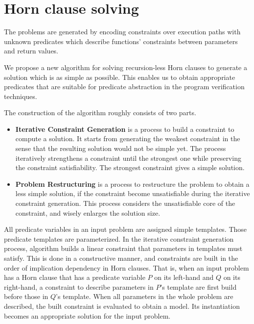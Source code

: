 \chapter{Horn clause solving}
\label{chap:horn}

The problems are generated by encoding constraints over execution
paths with unknown predicates which describe functions' constraints
between parameters and return values.



We propose a new algorithm for solving recursion-less Horn clauses to
generate a solution which is as simple as possible.  This enables us
to obtain appropriate predicates that are suitable for predicate
abstraction in the program verification techniques.

The construction of the algorithm roughly consists of two parts.
\begin{itemize}
\item \textbf{Iterative Constraint Generation} is a process to build a
  constraint to compute a solution.  It starts from generating the
  weakest constraint in the sense that the resulting solution would
  not be simple yet.  The process iteratively strengthens a constraint
  until the strongest one while preserving the constraint
  satisfiability.  The strongest constraint gives a simple solution.
\item \textbf{Problem Restructuring} is a process to restructure the
  problem to obtain a less simple solution, if the constraint become
  unsatisfiable during the iterative constraint generation.  This
  process considers the unsatisfiable core of the constraint, and
  wisely enlarges the solution size.
\end{itemize}

All predicate variables in an input problem are assigned simple
templates.  Those predicate templates are parameterized.  In the
iterative constraint generation process, algorithm builds a linear
constraint that parameters in templates must satisfy.  This is done in
a constructive manner, and constraints are built in the order of
implication dependency in Horn clauses.  That is, when an input
problem has a Horn clause that has a predicate variable $P$ on its
left-hand and $Q$ on its right-hand, a constraint to describe
parameters in $P$'s template are first build before those in $Q$'s
template.  When all parameters in the whole problem are described, the
built constraint is evaluated to obtain a model.  Its instantiation
becomes an appropriate solution for the input problem.

